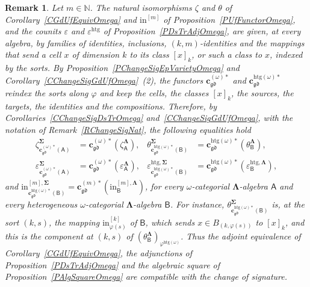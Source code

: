 \documentclass[a4paper, reqno]{amsbook}
\newcommand{\sig}[1]{\mathbf{#1}}             %
\newcommand{\calg}[1]{\boldsymbol{\mathsf{#1}}} %
\newcommand{\gd}{\mathfrak{gd}}              %
\newcommand{\htg}{\mathrm{htg}}                %
\theoremstyle{plain}
\newtheorem{remark}[theorem]{Remark}
\theoremstyle{definition}
\begin{document}
\begin{remark}\label{RChangeSigNatOmega}
Let $m\in\mathbb{N}$.
The natural isomorphisms $\zeta$ and $\theta$ of Corollary~\ref{CGdUfEquivOmega} and $\mathrm{in}^{[m]}$ of Proposition~\ref{PUfFunctorOmega}, and the counits $\varepsilon$ and $\varepsilon^{\htg}$ of Proposition~\ref{PDsTrAdjOmega}, are given, at every algebra, by families of identities, inclusions, $(k,m)$-identities and the mappings that send a cell $x$ of dimension $k$ to its class $[x]_{k}$, or such a class to $x$, indexed by the sorts.
By Proposition~\ref{PChangeSigEpVarietyOmega} and Corollary~\ref{CChangeSigGdUfOmega}~(2), the functors $\mathbf{c}^{(\omega)\ast}_{\gd}$ and $\mathbf{c}^{\htg(\omega)\ast}_{\gd}$ reindex the sorts along $\varphi$ and keep the cells, the classes $[x]_{k}$, the sources, the targets, the identities and the compositions.
Therefore, by Corollaries~\ref{CChangeSigDsTrOmega} and~\ref{CChangeSigGdUfOmega}, with the notation of Remark~\ref{RChangeSigNat}, the following equalities hold
\begin{align*}
\zeta^{\sig{\Sigma}}_{\mathbf{c}^{(\omega)\ast}_{\gd}(\calg{A})}&=\mathbf{c}^{(\omega)\ast}_{\gd}\left(\zeta^{\sig{\Lambda}}_{\calg{A}}\right),
&
\theta^{\sig{\Sigma}}_{\mathbf{c}^{\htg(\omega)\ast}_{\gd}(\calg{B})}&=\mathbf{c}^{\htg(\omega)\ast}_{\gd}\left(\theta^{\sig{\Lambda}}_{\calg{B}}\right),
\\
\varepsilon^{\sig{\Sigma}}_{\mathbf{c}^{(\omega)\ast}_{\gd}(\calg{A})}&=\mathbf{c}^{(\omega)\ast}_{\gd}\left(\varepsilon^{\sig{\Lambda}}_{\calg{A}}\right),
&
\varepsilon^{\htg,\sig{\Sigma}}_{\mathbf{c}^{\htg(\omega)\ast}_{\gd}(\calg{B})}&=\mathbf{c}^{\htg(\omega)\ast}_{\gd}\left(\varepsilon^{\htg,\sig{\Lambda}}_{\calg{B}}\right),
\end{align*}
and $\mathrm{in}^{[m],\sig{\Sigma}}_{\mathbf{c}^{\htg(\omega)\ast}_{\gd}(\calg{B})}=\mathbf{c}^{(m)\ast}_{\gd}(\mathrm{in}^{[m],\sig{\Lambda}}_{\calg{B}})$, for every $\omega$-categorial $\sig{\Lambda}$-algebra $\calg{A}$ and every heterogeneous $\omega$-categorial $\sig{\Lambda}$-algebra $\calg{B}$.
For instance, $\theta^{\sig{\Sigma}}_{\mathbf{c}^{\htg(\omega)\ast}_{\gd}(\calg{B})}$ is, at the sort $(k,s)$, the mapping $\mathrm{in}^{[k]}_{\varphi(s)}$ of $\calg{B}$, which sends $x\in B_{(k,\varphi(s))}$ to $[x]_{k}$, and this is the component at $(k,s)$ of $(\theta^{\sig{\Lambda}}_{\calg{B}})_{\varphi^{\htg(\omega)}}$.
Thus the adjoint equivalence of Corollary~\ref{CGdUfEquivOmega}, the adjunctions of Proposition~\ref{PDsTrAdjOmega} and the algebraic square of Proposition~\ref{PAlgSquareOmega} are compatible with the change of signature.
\end{remark}
\end{document}
